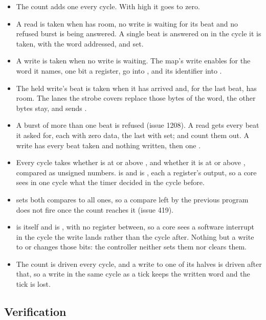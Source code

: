 \begin{itemize}
\item The count adds one every cycle. With  high it goes to
zero.
\item A read is taken when  has room, no write is waiting
for its beat and no refused burst is being answered. A single beat is
answered on  in the cycle it is taken, with the word
addressed,  and  set.
\item A write is taken when no write is waiting. The map's write
enables for the word it names, one bit a register, go into
, and its identifier into .
\item The held write's beat is taken when it has arrived and, for the
last beat,  has room. The lanes the strobe covers
replace those bytes of the word, the other bytes stay, and
 sends .
\item A burst of more than one beat is refused (issue 1208). A read
gets every beat it asked for, each  with zero data, the
last with  set;  and  count them out.
A write has every beat taken and nothing written, then one
.
\item Every cycle  takes whether  is at or
above , and  whether it is at or above
, compared as unsigned numbers.  is
 and  is , each a register's
output, so a core sees in one cycle what the timer decided in the
cycle before.
\item {} sets both compares to all ones, so a compare left by
the previous program does not fire once the count reaches it
(issue 419).
\item {} is  itself and  is
, with no register between, so a core sees a software
interrupt in the cycle the write lands rather than the cycle after.
Nothing but a write to  or  changes those
bits: the controller neither sets them nor clears them.
\item The count is driven every cycle, and a write to one of its halves
is driven after that, so a write in the same cycle as a tick keeps the
written word and the tick is lost.
\end{itemize}

\subsection*{Verification}


